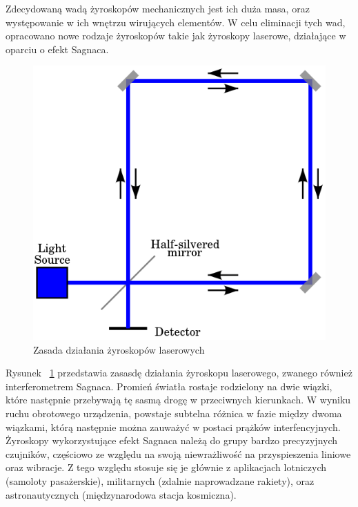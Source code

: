 Zdecydowaną wadą żyroskopów mechanicznych jest ich duża masa, oraz występowanie w ich wnętrzu wirujących elementów. W celu eliminacji tych wad, opracowano nowe rodzaje żyroskopów takie jak żyroskopy laserowe, działające w oparciu o efekt Sagnaca.

\begin{figure}[H]
	\centering
	\includegraphics[scale=0.4]{Pictures/Sagnac_interferometer.png}
        \caption[Zasada działania żyroskopów laserowych]{Zasada działania żyroskopów laserowych}
        \label{fig:300px-SagnacPhase}
\end{figure}

Rysunek ~\ref{fig:300px-SagnacPhase} przedstawia zasasdę działania żyroskopu laserowego, zwanego również interferometrem Sagnaca. Promień światła rostaje rodzielony na dwie wiązki, które następnie przebywają tę sasmą drogę w przeciwnych kierunkach. W wyniku ruchu obrotowego urządzenia, powstaje subtelna różnica w fazie między dwoma wiązkami, którą następnie można zauważyć w postaci prążków interfencyjnych. Żyroskopy wykorzystujące efekt Sagnaca należą do grupy bardzo precyzyjnych czujników, częściowo ze względu na swoją niewrażliwość na przyspieszenia liniowe oraz wibracje. Z tego względu stosuje się je głównie z aplikacjach lotniczych (samoloty pasażerskie), militarnych (zdalnie naprowadzane rakiety), oraz astronautycznych (międzynarodowa stacja kosmiczna). 

